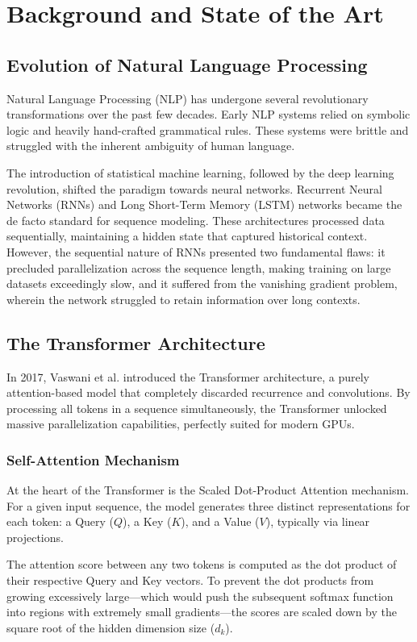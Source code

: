 \chapter{Background and State of the Art}
\label{ch:background}

\section{Evolution of Natural Language Processing}
Natural Language Processing (NLP) has undergone several revolutionary transformations over the past few decades. Early NLP systems relied on symbolic logic and heavily hand-crafted grammatical rules. These systems were brittle and struggled with the inherent ambiguity of human language.

The introduction of statistical machine learning, followed by the deep learning revolution, shifted the paradigm towards neural networks. Recurrent Neural Networks (RNNs) and Long Short-Term Memory (LSTM) networks became the de facto standard for sequence modeling. These architectures processed data sequentially, maintaining a hidden state that captured historical context. However, the sequential nature of RNNs presented two fundamental flaws: it precluded parallelization across the sequence length, making training on large datasets exceedingly slow, and it suffered from the vanishing gradient problem, wherein the network struggled to retain information over long contexts.

\section{The Transformer Architecture}
In 2017, Vaswani et al. \cite{vaswani2017attention} introduced the Transformer architecture, a purely attention-based model that completely discarded recurrence and convolutions. By processing all tokens in a sequence simultaneously, the Transformer unlocked massive parallelization capabilities, perfectly suited for modern GPUs.

\subsection{Self-Attention Mechanism}
At the heart of the Transformer is the Scaled Dot-Product Attention mechanism. For a given input sequence, the model generates three distinct representations for each token: a Query ($Q$), a Key ($K$), and a Value ($V$), typically via linear projections.

The attention score between any two tokens is computed as the dot product of their respective Query and Key vectors. To prevent the dot products from growing excessively large—which would push the subsequent softmax function into regions with extremely small gradients—the scores are scaled down by the square root of the hidden dimension size ($d_k$).

